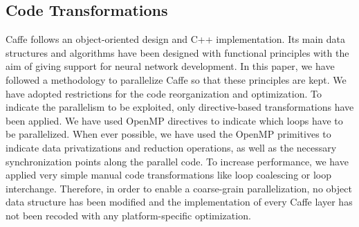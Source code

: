 \subsection{Code Transformations}
Caffe follows an object-oriented design and C++ implementation. 
Its main data structures and algorithms have been designed with 
functional principles with the aim of giving support for neural network 
development. In this paper, we have followed a methodology to 
parallelize Caffe so that these principles are kept. We have 
adopted restrictions for the code reorganization and optimization.
To indicate the parallelism to be exploited, only directive-based 
transformations have been applied. We have used OpenMP directives 
to indicate which loops have to be parallelized. When ever possible, 
we have used the OpenMP primitives to indicate data privatizations 
and reduction operations, as well as the necessary synchronization 
points along the parallel code. To increase performance, we have 
applied very simple manual code transformations like loop coalescing or 
loop interchange. Therefore, in order to enable a coarse-grain 
parallelization, no object data structure has been modified and 
the implementation of every Caffe layer has not been recoded with 
any platform-specific optimization.


